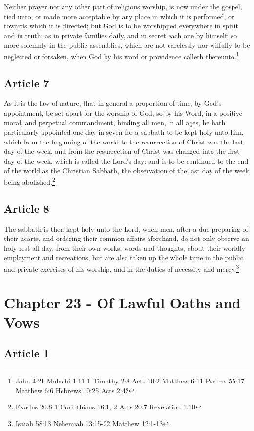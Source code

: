 \documentclass[12pt,letterpaper]{book}
\begin{document}
Neither prayer nor any other part of religious worship, is now under the gospel, tied unto, or made more acceptable by any place in which it is performed, or towards which it is directed; but God is to be worshipped everywhere in spirit and in truth; as in private families daily, and in secret each one by himself; so more solemnly in the public assemblies, which are not carelessly nor wilfully to be neglected or forsaken, when God by his word or providence calleth thereunto.\footnote{John 4:21 Malachi 1:11 1 Timothy 2:8 Acts 10:2 Matthew 6:11 Psalms 55:17 Matthew 6:6 Hebrews 10:25 Acts 2:42}

\section{Article 7}

As it is the law of nature, that in general a proportion of time, by God's appointment, be set apart for the worship of God, so by his Word, in a positive moral, and perpetual commandment, binding all men, in all ages, he hath particularly appointed one day in seven for a sabbath to be kept holy unto him, which from the beginning of the world to the resurrection of Christ was the last day of the week, and from the resurrection of Christ was changed into the first day of the week, which is called the Lord's day: and is to be continued to the end of the world as the Christian Sabbath, the observation of the last day of the week being abolished.\footnote{Exodus 20:8 1 Corinthians 16:1, 2 Acts 20:7 Revelation 1:10}

\section{Article 8}

The sabbath is then kept holy unto the Lord, when men, after a due preparing of their hearts, and ordering their common affairs aforehand, do not only observe an holy rest all day, from their own works, words and thoughts, about their worldly employment and recreations, but are also taken up the whole time in the public and private exercises of his worship, and in the duties of necessity and mercy.\footnote{Isaiah 58:13 Nehemiah 13:15-22 Matthew 12:1-13}

\chapter{Chapter 23 - Of Lawful Oaths and Vows}
\section{Article 1}
\end{document}
